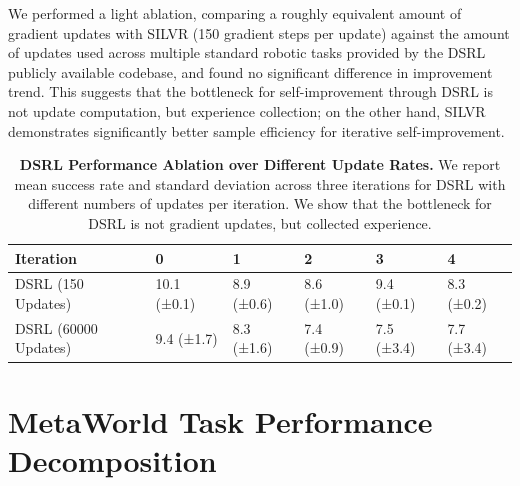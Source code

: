We performed a light ablation, comparing a roughly equivalent amount of gradient updates with SILVR (150 gradient steps per update) against the amount of updates used across multiple standard robotic tasks provided by the DSRL publicly available codebase, and found no significant difference in improvement trend.  This suggests that the bottleneck for self-improvement through DSRL is not update computation, but experience collection; on the other hand, SILVR demonstrates significantly better sample efficiency for iterative self-improvement.

\begin{table}[h]
\centering
\begin{tabular}{@{}llllll@{}}
\toprule
Iteration & 0           & 1           & 2           & 3           & 4           \\ \midrule
DSRL (150 Updates)   & 10.1 (±0.1)  & 8.9 (±0.6)   & 8.6 (±1.0)   & 9.4 (±0.1)   & 8.3 (±0.2)   \\
DSRL (60000 Updates) & 9.4 (±1.7)   & 8.3 (±1.6)   & 7.4 (±0.9)   & 7.5 (±3.4)   & 7.7 (±3.4)   \\ \bottomrule
\end{tabular}
\caption[]{\textbf{DSRL Performance Ablation over Different Update Rates.} We report mean success rate and standard deviation across three iterations for DSRL with different numbers of updates per iteration. We show that the bottleneck for DSRL is not gradient updates, but collected experience.}
\label{table:dsrl_update_comparison}
\end{table}

\vspace{-1em}
\section{MetaWorld Task Performance Decomposition}

